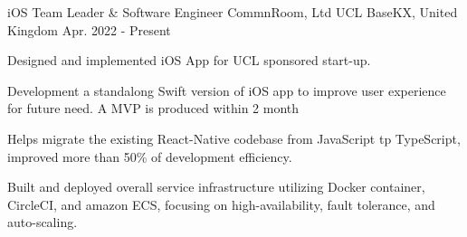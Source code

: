 \begin{cventries}
  \cventry
    {iOS Team Leader \& Software Engineer} %
    {CommnRoom, Ltd} %
    {UCL BaseKX, United Kingdom} %
    {Apr. 2022 - Present} %
    {
      \begin{cvitems} %
        \item {Designed and implemented iOS App for UCL sponsored start-up.}
        \item {Development a standalong Swift version of iOS app to improve user experience for future need. A MVP is produced within 2 month}
        \item {Helps migrate the existing React-Native codebase from JavaScript tp TypeScript, improved more than 50\% of development efficiency.}
        \item {Built and deployed overall service infrastructure utilizing Docker container, CircleCI, and amazon ECS, focusing on high-availability, fault tolerance, and auto-scaling.}
      \end{cvitems}
    }




\end{cventries}

